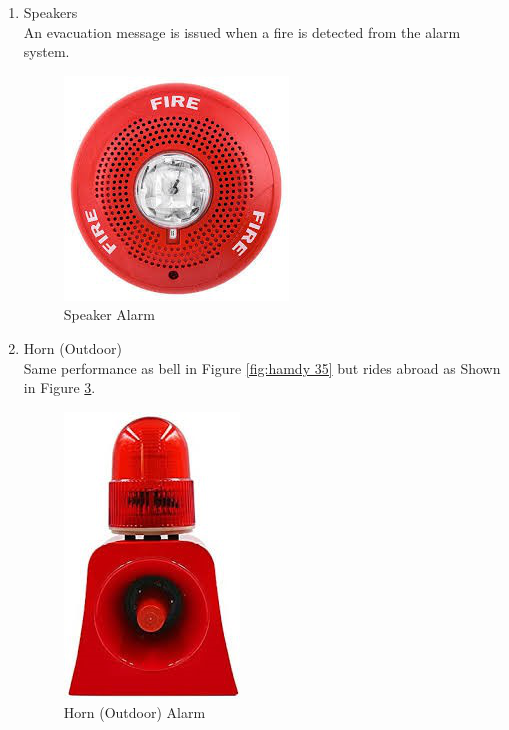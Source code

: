 \documentclass[12pt,fleqn]{book} %
\begin{document}
\begin{enumerate}
\begin{enumerate}
\begin{figure}[!h]
    \label{fig:hamdy 36}
\end{figure}
    \item Speakers
    \\ An evacuation message is issued when a fire is detected from the alarm system.
 \begin{figure}[!h]
    \centering
    \includegraphics[width=0.5\linewidth]{hamdy 37.png}
    \caption{Speaker Alarm}
    \label{fig:hamdy 37}
\end{figure}
    \item Horn (Outdoor)
   \\ Same performance as bell in Figure \ref{fig:hamdy 35} but rides abroad as Shown in Figure \ref{fig:hamdy 38}.
   \begin{figure}[!h]
    \centering
    \includegraphics[width=0.5\linewidth]{hamdy 38.png}
    \caption{Horn (Outdoor) Alarm}
    \label{fig:hamdy 38}
\end{figure}
\end{enumerate}




\end{enumerate}
\end{document}
